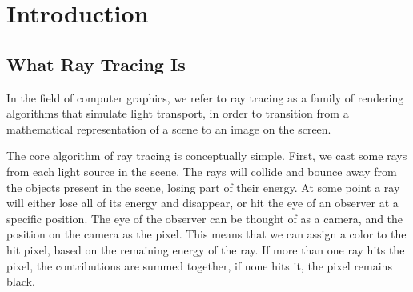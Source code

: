 \documentclass{PoliMi_MasterThesis}
\begin{document}

\chapter*{Introduction}
\section*{What Ray Tracing Is}
In the field of computer graphics, we refer to ray tracing as a family of rendering algorithms that simulate light transport, in order to transition from a mathematical representation of a scene to an image on the screen. 

The core algorithm of ray tracing is conceptually simple. First, we cast some rays from each light source in the scene. The rays will collide and bounce away from the objects present in the scene, losing part of their energy. At some point a ray will either lose all of its energy and disappear, or hit the eye of an observer at a specific position. The eye of the observer can be thought of as a camera, and the position on the camera as the pixel. This means that we can assign a color to the hit pixel, based on the remaining energy of the ray. If more than one ray hits the pixel, the contributions are summed together, if none hits it, the pixel remains black.
\end{document}

